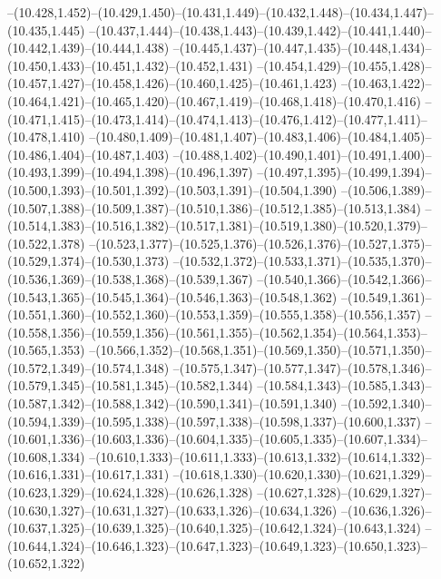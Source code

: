   --(10.428,1.452)--(10.429,1.450)--(10.431,1.449)--(10.432,1.448)--(10.434,1.447)--(10.435,1.445)%
  --(10.437,1.444)--(10.438,1.443)--(10.439,1.442)--(10.441,1.440)--(10.442,1.439)--(10.444,1.438)%
  --(10.445,1.437)--(10.447,1.435)--(10.448,1.434)--(10.450,1.433)--(10.451,1.432)--(10.452,1.431)%
  --(10.454,1.429)--(10.455,1.428)--(10.457,1.427)--(10.458,1.426)--(10.460,1.425)--(10.461,1.423)%
  --(10.463,1.422)--(10.464,1.421)--(10.465,1.420)--(10.467,1.419)--(10.468,1.418)--(10.470,1.416)%
  --(10.471,1.415)--(10.473,1.414)--(10.474,1.413)--(10.476,1.412)--(10.477,1.411)--(10.478,1.410)%
  --(10.480,1.409)--(10.481,1.407)--(10.483,1.406)--(10.484,1.405)--(10.486,1.404)--(10.487,1.403)%
  --(10.488,1.402)--(10.490,1.401)--(10.491,1.400)--(10.493,1.399)--(10.494,1.398)--(10.496,1.397)%
  --(10.497,1.395)--(10.499,1.394)--(10.500,1.393)--(10.501,1.392)--(10.503,1.391)--(10.504,1.390)%
  --(10.506,1.389)--(10.507,1.388)--(10.509,1.387)--(10.510,1.386)--(10.512,1.385)--(10.513,1.384)%
  --(10.514,1.383)--(10.516,1.382)--(10.517,1.381)--(10.519,1.380)--(10.520,1.379)--(10.522,1.378)%
  --(10.523,1.377)--(10.525,1.376)--(10.526,1.376)--(10.527,1.375)--(10.529,1.374)--(10.530,1.373)%
  --(10.532,1.372)--(10.533,1.371)--(10.535,1.370)--(10.536,1.369)--(10.538,1.368)--(10.539,1.367)%
  --(10.540,1.366)--(10.542,1.366)--(10.543,1.365)--(10.545,1.364)--(10.546,1.363)--(10.548,1.362)%
  --(10.549,1.361)--(10.551,1.360)--(10.552,1.360)--(10.553,1.359)--(10.555,1.358)--(10.556,1.357)%
  --(10.558,1.356)--(10.559,1.356)--(10.561,1.355)--(10.562,1.354)--(10.564,1.353)--(10.565,1.353)%
  --(10.566,1.352)--(10.568,1.351)--(10.569,1.350)--(10.571,1.350)--(10.572,1.349)--(10.574,1.348)%
  --(10.575,1.347)--(10.577,1.347)--(10.578,1.346)--(10.579,1.345)--(10.581,1.345)--(10.582,1.344)%
  --(10.584,1.343)--(10.585,1.343)--(10.587,1.342)--(10.588,1.342)--(10.590,1.341)--(10.591,1.340)%
  --(10.592,1.340)--(10.594,1.339)--(10.595,1.338)--(10.597,1.338)--(10.598,1.337)--(10.600,1.337)%
  --(10.601,1.336)--(10.603,1.336)--(10.604,1.335)--(10.605,1.335)--(10.607,1.334)--(10.608,1.334)%
  --(10.610,1.333)--(10.611,1.333)--(10.613,1.332)--(10.614,1.332)--(10.616,1.331)--(10.617,1.331)%
  --(10.618,1.330)--(10.620,1.330)--(10.621,1.329)--(10.623,1.329)--(10.624,1.328)--(10.626,1.328)%
  --(10.627,1.328)--(10.629,1.327)--(10.630,1.327)--(10.631,1.327)--(10.633,1.326)--(10.634,1.326)%
  --(10.636,1.326)--(10.637,1.325)--(10.639,1.325)--(10.640,1.325)--(10.642,1.324)--(10.643,1.324)%
  --(10.644,1.324)--(10.646,1.323)--(10.647,1.323)--(10.649,1.323)--(10.650,1.323)--(10.652,1.322)%
